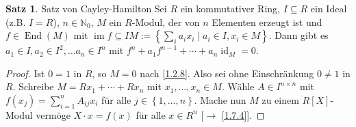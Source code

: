 \documentclass[
twoside=semi,
fontsize=12,
DIV=12, 
cleardoublepage=current,
leqno,
headings=optiontoheadandtoc, 
toc=idx
]{scrbook}
\newcommand{\N}{\mathbb{N}}
\newcommand{\set}[1]{\left\{ #1 \right\}}
\DeclareMathOperator{\im}{im}
\DeclareMathOperator{\id}{id}
\DeclareMathOperator{\End}{End}
\theoremstyle{definition}
\newtheorem{satz}[definition]{Satz}
\begin{document}
	\begin{satz}\label{1.7.5} Satz von Cayley-Hamilton\newline
		Sei $R$ ein kommutativer Ring, $I \subseteq R$ ein Ideal (z.B. $I = R$), $n\in \N_0$, $M$ ein $R$-Modul, der von $n$ Elementen erzeugt ist und $f \in \End(M)$ mit 
		$\displaystyle \im f \subseteq IM := \set{\sum_i a_ix_i \mid a_i \in I, x_i \in M}$. 
		Dann gibt es $a_1 \in I, a_2 \in I^2, \dots a_n \in I^n$ mit $f^n + a_1f^{n-1} + \cdots + a_n \id_M = 0$.
		
		\begin{proof}
			Ist $0 = 1$ in $R$, so $M = 0$ nach \ref{1.2.8}. Also sei ohne Einschr\"ankung $0\neq 1$ in $R$. Schreibe 
			$M = Rx_1 + \cdots + Rx_n$ mit $x_1, \dots, x_n \in M$. W\"ahle $A \in I^{n\times n}$ mit \linebreak $\displaystyle f(x_j) = \sum_{i=1}^n A_{ij}x_i$ f\"ur alle $j \in \set{1, \dots, n}$.
			Mache nun $M$ zu einem $R[X]$-Modul verm\"oge $X \cdot x = f(x)$ f\"ur alle $x \in R^n$ [$\to$ \ref{1.7.4}].
			

\end{proof}
\end{satz}
\end{document}
